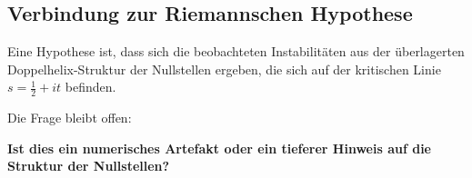 \documentclass[a4paper,12pt]{article}
\begin{document}
\subsection{Verbindung zur Riemannschen Hypothese}
Eine Hypothese ist, dass sich die beobachteten Instabilitäten aus der überlagerten Doppelhelix-Struktur der Nullstellen ergeben, die sich auf der kritischen Linie $s = \frac{1}{2} + it$ befinden.

Die Frage bleibt offen:
\begin{center}
\textbf{Ist dies ein numerisches Artefakt oder ein tieferer Hinweis auf die Struktur der Nullstellen?}
\end{center}
\end{document}
